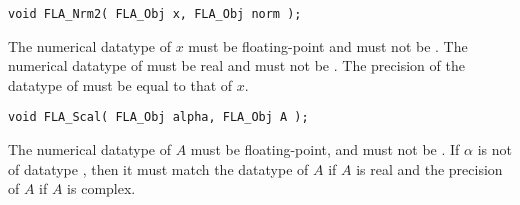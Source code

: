 
\begin{flaspec}
\begin{verbatim}
void FLA_Nrm2( FLA_Obj x, FLA_Obj norm );
\end{verbatim}
\begin{checks}
\checkitem
The numerical datatype of $ x $ must be floating-point and must not be
\flaconstantns.
\itemvsp
\checkitem
The numerical datatype of \norm must be real and must not be \flaconstantns.
\itemvsp
\checkitem
The precision of the datatype of \norm must be equal to that of $ x $.
\end{checks}
\begin{params}
\end{params}
\end{flaspec}


\begin{flaspec}
\begin{verbatim}
void FLA_Scal( FLA_Obj alpha, FLA_Obj A );
\end{verbatim}
\begin{checks}
\checkitem
The numerical datatype of $ A $ must be floating-point, and must not be
\flaconstantns.
\itemvsp
\checkitem
If $ \alpha $ is not of datatype \flaconstantns, then it must
match the datatype of $ A $ if $ A $ is real and the precision of $ A $ if
$ A $ is complex.
\end{checks}
\begin{params}
\end{params}
\end{flaspec}

